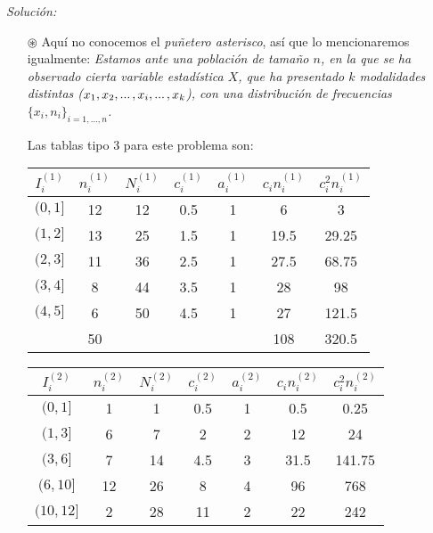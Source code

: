 \documentclass[11pt,a4paper]{article}
\theoremstyle{definition}
\begin{document}
{\color{grey}\hrulefill}

\emph{Solución:}

\begin{itemize}
	\item[$\circledast$] Aquí no conocemos el \emph{puñetero asterisco}, así que lo mencionaremos igualmente:
	\emph{Estamos ante una población de tamaño $n$, en la que se ha observado cierta variable estadística $X$, que ha presentado $k$ modalidades distintas ($x_1, x_2, ...\hspace{0.05cm}, x_i, ...\hspace{0.05cm}, x_k$), con una distribución de frecuencias $\{x_i, n_i\}_{i=1,...,n}$.}
	\item[ ] Las tablas tipo 3 para este problema son:

\begin{table}[!htbp]
\hspace{-0.85cm}
\begin{tabular}{|c|c|c|c|c|c|c|}
\multicolumn{1}{c|}{$I_i^{(1)}$} & $n_i^{(1)}$ & $N_i^{(1)}$ & $c_i^{(1)}$ & $a_i^{(1)}$ & $c_in_i^{(1)}$ & $c_i^2n_i^{(1)}$ \\ \hline
$(0, 1]$ & 12	& 	12	& 0.5 & 1 & 6 & 3\\
$(1, 2]$ & 13 & 25		& 1.5 & 1 & 19.5 & 29.25 \\
$(2, 3]$ & 11 & 	36	& 2.5 & 1 & 27.5 & 68.75 \\
$(3, 4]$ & 8 & 	44	& 3.5	& 1 & 28 & 98 \\
$(4, 5]$ & 6	& 50	& 	4.5	& 	1 & 27 & 121.5\\ \hline
\multicolumn{1}{c}{} & \multicolumn{1}{|c|}{50} & \multicolumn{1}{c}{} & \multicolumn{1}{c}{} & \multicolumn{1}{c}{} & \multicolumn{1}{|c|}{108} & \multicolumn{1}{c|}{320.5} \\ \cline{2-2} \cline{6-7}
\end{tabular}
\hspace*{0.2cm}
{
\begin{tabular}{|c|c|c|c|c|c|c|}
\multicolumn{1}{c|}{$I_i^{(2)}$} & $n_i^{(2)}$ & $N_i^{(2)}$ & $c_i^{(2)}$ & $a_i^{(2)}$ & $c_in_i^{(2)}$ & $c_i^2n_i^{(2)}$ \\ \hline
$(0, 1]$ & 1	& 	1	& 0.5 & 1 & 0.5 & 0.25\\
$(1, 3]$ & 6 & 7		& 2 & 2 & 12 & 24\\
$(3, 6]$ & 7 & 	14	& 4.5 & 3 & 31.5 & 141.75\\
$(6, 10]$ & 12 & 	26	& 8	&4 & 96 & 768\\
$(10, 12]$ & 2	& 28	& 	11	& 	2 & 22 & 242\\ \hline

\end{tabular}}
\end{table}
\end{itemize}
\end{document}
